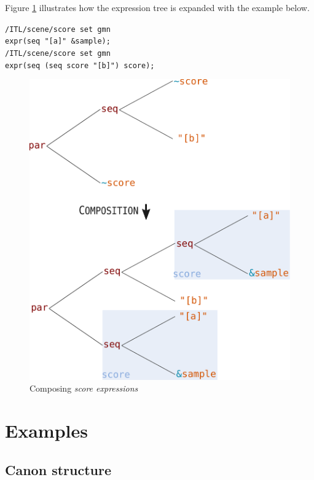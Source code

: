 \documentclass{article}
\newcommand{\oper}[1]{\textcolor{figRed}{#1}}
\newcommand{\param}[1]{\textcolor{figOrange}{#1}}
\newcommand{\prefix}[1]{\textcolor{figBlue}{#1}}
\newcommand{\sExpr}{\emph{score expressions}}
\newcommand{\lowTilde}{\texttildelow}
\newcommand{\tab}{\hspace*{4mm}}
\newcommand{\sample}	[1]			{\vspace{-0.2em}\begin{center}\colorbox{mygrey}{\begin{minipage}[t]{0.95\columnwidth} {\small \texttt{#1}}\end{minipage}}\end{center}}
\begin{document}
Figure \ref{fig:expandingTree} illustrates how the expression tree is expanded with the example below.

\sample{/ITL/scene/score set gmn\\
\tab expr(\oper{seq} \param{"[a]"} \prefix{\&}\param{sample});\\
/ITL/scene/score set gmn  \\
\tab expr(\oper{seq} (\oper{seq} \prefix{\lowTilde}\param{score} \param{"[b]"}) \prefix{\lowTilde}\param{score});
}

\begin{figure}[th]
\centering
\includegraphics[width=0.9\columnwidth]{imgs/expandingTree}
\caption{Composing \sExpr
\label{fig:expandingTree}}
\end{figure}

\section{Examples}
\label{examples}

\subsection{Canon structure}
\end{document}
